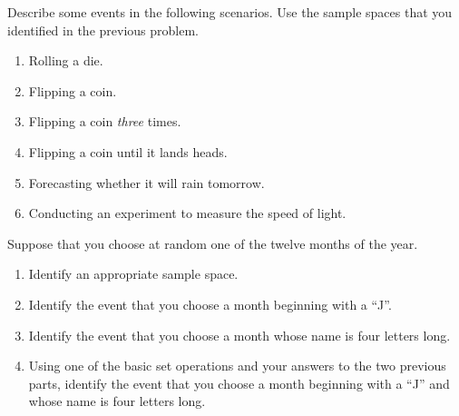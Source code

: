 \documentclass[12pt,reqno]{amsart}
\begin{document}
\newpage
\prob Describe some events in the following scenarios. Use the sample spaces that you identified in the previous problem.

\medskip
\begin{enumerate}
    \item Rolling a die.\vfill
    
    

    \item Flipping a coin.\vfill
    
    

    \item Flipping a coin \textit{three} times.\vfill
    
    

    \item Flipping a coin until it lands heads.\vfill
    
    

    \item Forecasting whether it will rain tomorrow.\vfill
    
    

    \item Conducting an experiment to measure the speed of light.\vfill
    
    
\end{enumerate}












\prob Suppose that you choose at random one of the twelve months of the year.

\begin{enumerate}
    \item Identify an appropriate sample space.\vfill
    
    

    \item Identify the event that you choose a month beginning with a ``J''.\vfill
    
    

    \item Identify the event that you choose a month whose name is four letters long.\vfill
    
    

    \item Using one of the basic set operations and your answers to the two previous parts, identify the event that you choose a month beginning with a ``J'' and whose name is four letters long.\vfill
    

\end{enumerate}
\end{document}
